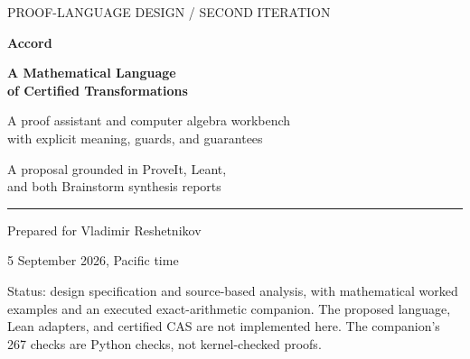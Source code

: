 \documentclass[11pt,letterpaper]{article}
\theoremstyle{definition}
\begin{document}
\begin{titlepage}
\color{ink}
{\sffamily\large PROOF-LANGUAGE DESIGN \quad / \quad SECOND ITERATION\par}
\vspace{1.05in}
{\sffamily\bfseries\fontsize{37}{42}\selectfont Accord\par}
\vspace{.20in}
{\sffamily\bfseries\fontsize{25}{30}\selectfont A Mathematical Language\\of Certified Transformations\par}
\vspace{.32in}
{\sffamily\Large A proof assistant and computer algebra workbench\\with explicit meaning, guards, and guarantees\par}
\vspace{.55in}
{\large A proposal grounded in ProveIt, Leant,\\and both Brainstorm synthesis reports\par}
\vfill
\rule{\textwidth}{.8pt}
\vspace{.15in}
Prepared for Vladimir Reshetnikov\par
5 September 2026, Pacific time\par
\vspace{.2in}
{\small\color{muted}
Status: design specification and source-based analysis, with mathematical
worked examples and an executed exact-arithmetic companion. The proposed
language, Lean adapters, and certified CAS are not implemented here.
The companion's 267 checks are Python checks, not kernel-checked proofs.
}
\end{titlepage}
\end{document}
